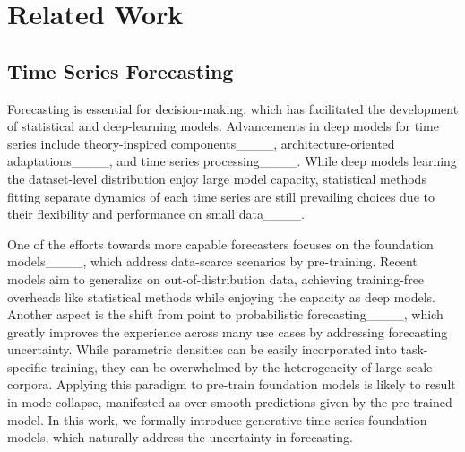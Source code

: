 \section{Related Work}
\subsection{Time Series Forecasting}
Forecasting is essential for decision-making, which has facilitated the development of statistical and deep-learning models. Advancements in deep models for time series include theory-inspired components____, architecture-oriented adaptations____, and time series processing____. While deep models learning the dataset-level distribution enjoy large model capacity, statistical methods fitting separate dynamics of each time series are still prevailing choices due to their flexibility and performance on small data____.

One of the efforts towards more capable forecasters focuses on the foundation models____, which address data-scarce scenarios by pre-training. Recent models aim to generalize on out-of-distribution data, achieving training-free overheads like statistical methods while enjoying the capacity as deep models. Another aspect is the shift from point to probabilistic forecasting____, which greatly improves the experience across many use cases by addressing forecasting uncertainty. While parametric densities can be easily incorporated into task-specific training, they can be overwhelmed by the heterogeneity of large-scale corpora. Applying this paradigm to pre-train foundation models is likely to result in mode collapse, manifested as over-smooth predictions given by the pre-trained model. In this work, we formally introduce generative time series foundation models, which naturally address the uncertainty in forecasting.


